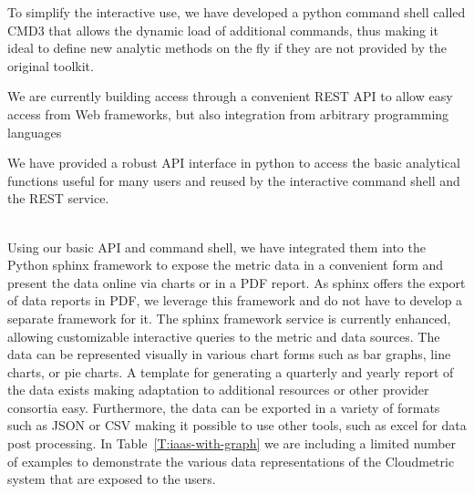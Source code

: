 \documentclass{tex/sig-alternate-2013}
\begin{document}
\begin{description}[leftmargin=*,itemsep=0pt,topsep=0pt]

\item[Interactive Command Shell.] To simplify the interactive use, we have developed a python command shell called CMD3 that allows the dynamic load of additional commands, thus making it ideal to define new analytic methods on the fly if they are not provided by the original toolkit.

\item[REST API.] We are currently building access through a convenient REST API to allow easy access from Web frameworks, but also integration from arbitrary programming languages

\item[Programming API.] We have provided a robust API interface in python to access the basic analytical functions useful for many users and reused by the interactive command shell and the REST service.

\item[Graphical Representation and Printable Reports.] ~\\ Using our
  basic API and command shell, we have integrated them into the Python
  sphinx framework to expose the metric data in a convenient form and
  present the data online via charts or in a PDF report. As sphinx
  offers the export of data reports in PDF, we leverage this framework
  and do not have to develop a separate framework for it. The sphinx
  framework service is currently enhanced, allowing customizable
  interactive queries to the metric and data sources. The data can be
  represented visually in various chart forms such as bar graphs, line
  charts, or pie charts. A template for generating a quarterly and
  yearly report of the data exists making adaptation to additional
  resources or other provider consortia easy. Furthermore, the data
  can be exported in a variety of formats such as JSON or CSV making
  it possible to use other tools, such as excel for data post
  processing.  In Table~\ref{T:iaas-with-graph} we are including a
  limited number of examples to demonstrate the various data
  representations of the Cloudmetric system that are exposed to the
  users.

\end{description}
\end{document}
